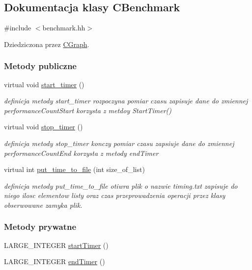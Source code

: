 \hypertarget{class_c_benchmark}{}\subsection{Dokumentacja klasy C\+Benchmark}
\label{class_c_benchmark}


{\ttfamily \#include $<$benchmark.\+hh$>$}



Dziedziczona przez \hyperlink{class_c_graph}{C\+Graph}.

\subsubsection*{Metody publiczne}
\begin{DoxyCompactItemize}
\item 
virtual void \hyperlink{class_c_benchmark_aa6f22bf0b316b51db8f439c7420a1666}{start\+\_\+timer} ()
\begin{DoxyCompactList}\small\item\em definicja metody start\+\_\+timer rozpoczyna pomiar czasu zapisuje dane do zmiennej performance\+Count\+Start korzysta z metdoy Start\+Timer() \end{DoxyCompactList}\item 
virtual void \hyperlink{class_c_benchmark_a945aaa453776cd11395166b470d11778}{stop\+\_\+timer} ()
\begin{DoxyCompactList}\small\item\em definicja metody stop\+\_\+timer konczy pomiar czasu zapsiuje dane do zmiennej performance\+Count\+End korzysta z metody end\+Timer \end{DoxyCompactList}\item 
virtual int \hyperlink{class_c_benchmark_acb3046f4f9fdff7c17c7633baf41cf36}{put\+\_\+time\+\_\+to\+\_\+file} (int size\+\_\+of\+\_\+list)
\begin{DoxyCompactList}\small\item\em definicja metody put\+\_\+time\+\_\+to\+\_\+file otiwra plik o nazwie \textquotesingle{}timing.\+txt\textquotesingle{} zapisuje do niego ilosc elementow listy oraz czas przeprowadzenia operacji przez klasy obserwowane zamyka plik. \end{DoxyCompactList}\end{DoxyCompactItemize}
\subsubsection*{Metody prywatne}
\begin{DoxyCompactItemize}
\item 
L\+A\+R\+G\+E\+\_\+\+I\+N\+T\+E\+G\+E\+R \hyperlink{class_c_benchmark_a43dd8d9d01499e28f1dc899ea6f3ed97}{start\+Timer} ()
\item 
L\+A\+R\+G\+E\+\_\+\+I\+N\+T\+E\+G\+E\+R \hyperlink{class_c_benchmark_aab174262b346c522bdbc1df87ed93532}{end\+Timer} ()
\end{DoxyCompactItemize}
